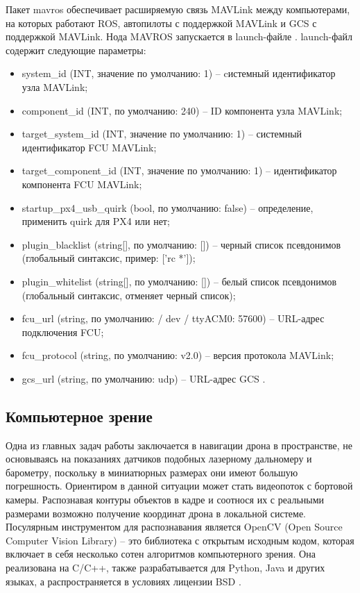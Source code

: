 Пакет mavros обеспечивает расширяемую связь MAVLink между компьютерами, на которых работают ROS, автопилоты с поддержкой MAVLink и GCS с поддержкой MAVLink. Нода MAVROS запускается в launch-файле \cite{clover}.
launch-файл содержит следующие параметры:
\begin{itemize}
\item  system\_id (INT, значение по умолчанию: 1) -- cистемный идентификатор узла MAVLink;

\item  component\_id (INT, по умолчанию: 240) -- ID компонента узла MAV\-Link;

\item  target\_system\_id (INT, значение по умолчанию: 1) -- системный идентификатор FCU MAVLink;

\item  target\_component\_id (INT, значение по умолчанию: 1) -- идентификатор компонента FCU MAVLink;

\item  startup\_px4\_usb\_quirk (bool, по умолчанию: false) -- определение, применить quirk для PX4 или нет;

\item  plugin\_blacklist (string[], по умолчанию: []) -- черный список псевдонимов (глобальный синтаксис, пример: ['rc *']);

\item  plugin\_whitelist (string[], по умолчанию: []) -- белый список псевдонимов (глобальный синтаксис, отменяет черный список);

\item  fcu\_url (string, по умолчанию: / dev / ttyACM0: 57600) -- URL-адрес подключения FCU;

\item  fcu\_protocol (string, по умолчанию: v2.0) -- версия протокола MAVLink;

\item  gcs\_url (string, по умолчанию: udp) -- URL-адрес GCS \cite{ros}.
\end{itemize}

\subsection{Компьютерное зрение}
Одна из главных задач работы заключается в навигации дрона в пространстве, не основываясь на показаниях датчиков подобных лазерному дальномеру и барометру, поскольку в миниатюрных размерах они имеют большую погрешность. Ориентиром в данной ситуации может стать видеопоток с бортовой камеры. Распознавая контуры объектов в кадре и соотнося их с реальными размерами возможно получение координат дрона в локальной системе. Посулярным инструментом для распознавания является Open\-CV (Open Source Computer Vision Library) -- это библиотека с открытым исходным кодом, которая включает в себя несколько сотен алгоритмов компьютерного зрения. Она реализована на C/C++, также разрабатывается для Python, Java и других языках, а распространяется в условиях лицензии BSD \cite{opencv}.

